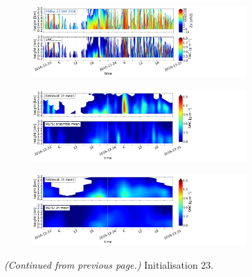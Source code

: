 \begin{figure}[H]\ContinuedFloat
	\centering
	\begin{subfigure}[t]{\textwidth}
		\centering
		\includegraphics[trim={0.cm 2.2cm 19.cm 0.5cm},clip,width=0.9\textwidth]{./fig_obs_ret/20161223}
		\caption{}\label{fig:SWC:ret_23}
	\end{subfigure}
	\begin{subfigure}[t]{\textwidth}
		\centering
		\includegraphics[trim={0.cm 2.2cm 19.cm 0.5cm},clip,width=0.9\textwidth]{./fig_vert_SWC_EM/20161223}
		\caption{}\label{fig:SWC_EM:23}
	\end{subfigure}
	\begin{subfigure}[t]{\textwidth}
		\centering
		\includegraphics[trim={0.cm 0.8cm 19.cm 0.5cm},clip,width=0.9\textwidth]{./fig_vert_SWC_3h/20161223}
		\caption{}\label{fig:SWC3h:23}
	\end{subfigure}
	\caption{\textit{(Continued from previous page.)} Initialisation \SI{23}{\dec}.}
\end{figure}
